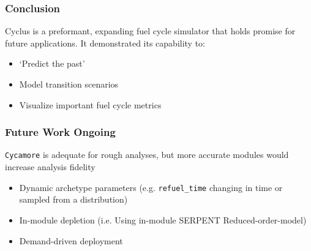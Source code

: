 \begin{frame}
    \frametitle{Conclusion}
    Cyclus is a preformant, expanding fuel cycle simulator that holds promise for future applications. It demonstrated its capability to:
    \begin{itemize}
        \item `Predict the past'
        \item Model transition scenarios
        \item Visualize important fuel cycle metrics
    \end{itemize}
\end{frame}

\begin{frame}
    \frametitle{Future Work Ongoing}
    \texttt{Cycamore} is adequate for rough analyses, but more accurate
    modules would increase analysis fidelity
    \begin{itemize}
        \item Dynamic archetype parameters (e.g. \texttt{refuel\_time}
                changing in time or sampled from a distribution)
        \item In-module depletion (i.e. Using in-module SERPENT Reduced-order-model)
        \item Demand-driven deployment \footnotemark
    \end{itemize}
\end{frame}
